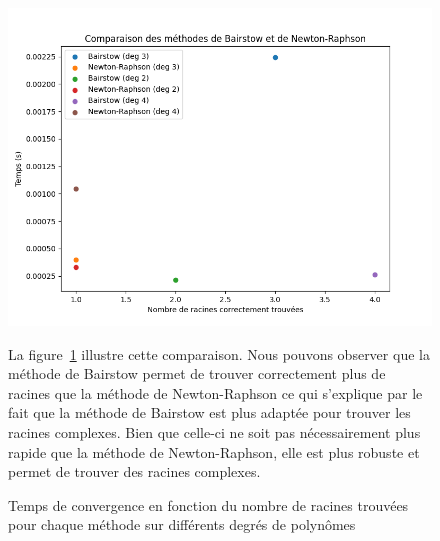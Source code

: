 \documentclass{article}
\begin{document}
\begin{figure}[H]
  \centering
  \begin{minipage}{0.56\textwidth}
  \includegraphics[width=\textwidth]{bairstow_plot.png}
  \caption{Temps de convergence en fonction du nombre de racines trouvées pour chaque méthode sur différents degrés de polynômes}
  \label{fig:bairstow}
  \end{minipage}%
  \hfill
  \begin{minipage}{0.4\textwidth}
  La figure~\ref{fig:bairstow} illustre cette comparaison. Nous pouvons observer que la méthode de Bairstow permet de trouver correctement plus de racines que la méthode de Newton-Raphson ce qui s'explique par le fait que la méthode de Bairstow est plus adaptée pour trouver les racines complexes. Bien que celle-ci ne soit pas nécessairement plus rapide que la méthode de Newton-Raphson, elle est plus robuste et permet de trouver des racines complexes. 
  \end{minipage}%
\end{figure}
\end{document}
